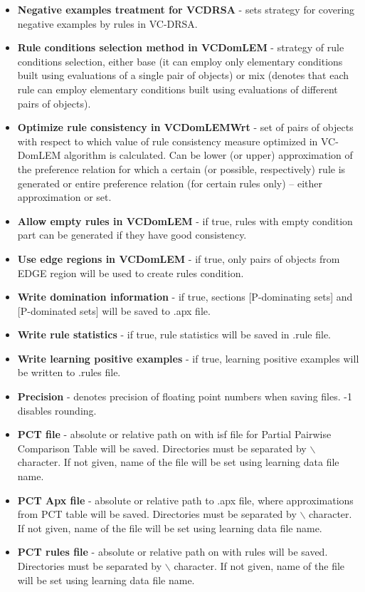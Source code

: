 \begin{itemize}
	\item \textbf{Negative examples treatment for VCDRSA} - sets strategy for covering negative examples by rules in VC-DRSA.
	\item \textbf{Rule conditions selection method in VCDomLEM} - strategy of rule conditions selection, either base (it can employ only elementary conditions built using evaluations of a single pair of objects) or mix (denotes that each rule can employ elementary conditions built using evaluations of different pairs of objects).
	\item \textbf{Optimize rule consistency in VCDomLEMWrt} - set of pairs of objects with respect to which value of rule consistency measure optimized in VC-DomLEM algorithm is calculated. Can be lower (or upper) approximation of the preference relation for which a certain (or possible, respectively) rule is generated or entire preference relation (for certain rules only) – either approximation or set.
	\item \textbf{Allow empty rules in VCDomLEM} - if true, rules with empty condition part can be generated if they have good consistency.
	\item \textbf{Use edge regions in VCDomLEM} - if true, only pairs of objects from EDGE region will be used to create rules condition.
	\item \textbf{Write domination information} - if true, sections [P-dominating sets] and [P-dominated sets] will be saved to .apx file.
	\item \textbf{Write rule statistics} - if true, rule statistics will be saved in .rule file.
	\item \textbf{Write learning positive examples} - if true, learning positive examples will be written to .rules file.
	\item \textbf{Precision} - denotes precision of floating point numbers when saving files. -1 disables rounding.
	\item \textbf{PCT file} - absolute or relative path on with isf file for Partial Pairwise Comparison Table will be saved. Directories must be separated by $\backslash$ character. If not given, name of the file will be set using learning data file name.
	\item \textbf{PCT Apx file} - absolute or relative path to .apx file, where approximations from PCT table will be saved. Directories must be separated by $\backslash$ character. If not given, name of the file will be set using learning data file name.
	\item \textbf{PCT rules file} - absolute or relative path on with rules will be saved. Directories must be separated by $\backslash$ character. If not given, name of the file will be set using learning data file name.

\end{itemize}
